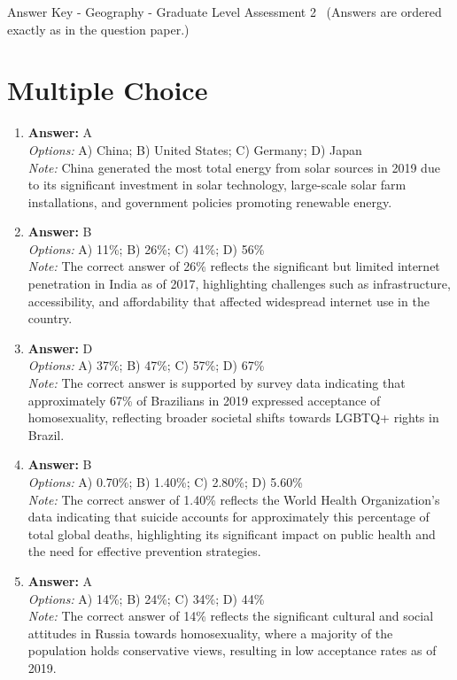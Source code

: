 \documentclass[12pt]{article}
\begin{document}
\begin{center}
Answer Key - Geography - Graduate Level Assessment 2 \
\small (Answers are ordered exactly as in the question paper.)
\end{center}

\section*{Multiple Choice}
\begin{enumerate}[label=\arabic*.]
\item \textbf{Answer:} A
\\ \textit{Options:} A) China; B) United States; C) Germany; D) Japan
\\ \textit{Note:} China generated the most total energy from solar sources in 2019 due to its significant investment in solar technology, large-scale solar farm installations, and government policies promoting renewable energy.
\item \textbf{Answer:} B
\\ \textit{Options:} A) 11\%; B) 26\%; C) 41\%; D) 56\%
\\ \textit{Note:} The correct answer of 26\% reflects the significant but limited internet penetration in India as of 2017, highlighting challenges such as infrastructure, accessibility, and affordability that affected widespread internet use in the country.
\item \textbf{Answer:} D
\\ \textit{Options:} A) 37\%; B) 47\%; C) 57\%; D) 67\%
\\ \textit{Note:} The correct answer is supported by survey data indicating that approximately 67\% of Brazilians in 2019 expressed acceptance of homosexuality, reflecting broader societal shifts towards LGBTQ+ rights in Brazil.
\item \textbf{Answer:} B
\\ \textit{Options:} A) 0.70\%; B) 1.40\%; C) 2.80\%; D) 5.60\%
\\ \textit{Note:} The correct answer of 1.40\% reflects the World Health Organization's data indicating that suicide accounts for approximately this percentage of total global deaths, highlighting its significant impact on public health and the need for effective prevention strategies.
\item \textbf{Answer:} A
\\ \textit{Options:} A) 14\%; B) 24\%; C) 34\%; D) 44\%
\\ \textit{Note:} The correct answer of 14\% reflects the significant cultural and social attitudes in Russia towards homosexuality, where a majority of the population holds conservative views, resulting in low acceptance rates as of 2019.
\end{enumerate}
\end{document}
